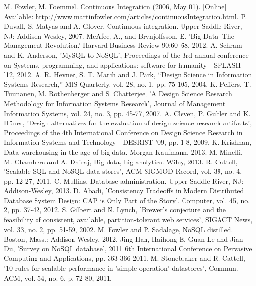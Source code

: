 \begin{thebibliography}{69}

 M. Fowler, M. Foemmel. Continuous Integration (2006, May 01). [Online] Available: http://www.martinfowler.com/articles/continuousIntegration.html.
 P. Duvall, S. Matyas and A. Glover, Continuous integration. Upper Saddle River, NJ: Addison-Wesley, 2007.
 McAfee, A., and Brynjolfsson, E. 'Big Data: The Management Revolution.' Harvard Business Review 90:60–68, 2012.
 A. Schram and K. Anderson, 'MySQL to NoSQL', Proceedings of the 3rd annual conference on Systems, programming, and applications: software for humanity - SPLASH '12, 2012.
 A. R. Hevner, S. T. March and J. Park, “Design Science in Information Systems
Research,” MIS Quarterly, vol. 28, no. 1, pp. 75-105, 2004.
 K. Peffers, T. Tuunanen, M. Rothenberger and S. Chatterjee, 'A Design Science Research Methodology for Information Systems Research', Journal of Management Information Systems, vol. 24, no. 3, pp. 45-77, 2007.
 A.  Cleven, P.  Gubler and K.  Hüner, 'Design alternatives for the evaluation of design science research artifacts', Proceedings of the 4th International Conference on Design Science Research in Information Systems and Technology - DESRIST '09, pp. 1-8, 2009.
 K. Krishnan, Data warehousing in the age of big data. Morgan Kaufmann, 2013.
M. Minelli, M. Chambers and A. Dhiraj, Big data, big analytics. Wiley, 2013. 
 R. Cattell, 'Scalable SQL and NoSQL data stores', ACM SIGMOD Record, vol. 39, no. 4, pp. 12-27, 2011.
 C. Mullins, Database administration. Upper Saddle River, NJ: Addison-Wesley, 2013.
 D.  Abadi, 'Consistency Tradeoffs in Modern Distributed Database System Design: CAP is Only Part of the Story', Computer, vol. 45, no. 2, pp. 37-42, 2012.
 S.  Gilbert and N.  Lynch, 'Brewer's conjecture and the feasibility of consistent, available, partition-tolerant web services', SIGACT News, vol. 33, no. 2, pp. 51-59, 2002.
 M. Fowler and P. Sadalage, NoSQL distilled. Boston, Mass.: Addison-Wesley, 2012.
 Jing Han, Haihong E, Guan Le and Jian Du, 'Survey on NoSQL database', 2011 6th International Conference on Pervasive Computing and Applications, pp. 363-366 2011.
 M. Stonebraker and R. Cattell, '10 rules for scalable performance in 'simple operation' datastores', Commun. ACM, vol. 54, no. 6, p. 72-80, 2011. 

\end{thebibliography}
